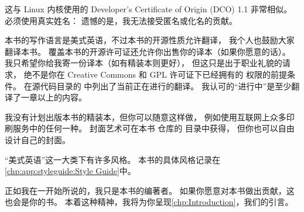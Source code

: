 这与 Linux 内核使用的 Developer's Certificate of Origin (DCO) 1.1
非常相似。
必须使用真实姓名：
遗憾的是，我无法接受匿名或化名的贡献。

本书的写作语言是美式英语，不过本书的开源性质允许翻译，
我个人也鼓励大家翻译本书。
覆盖本书的开源许可证还允许你出售你的译本（如果你愿意的话）。
我只希望你给我寄一份译本（如有精装本则更好），
但这只是出于职业礼貌的请求，
绝不是你在 Creative Commons 和 GPL 许可证下已经拥有的
权限的前提条件。
在源代码目录的  中列出了当前正在进行的翻译。
我认可的``进行中''是至少翻译了一章以上的内容。

我没有计划出版本书的精装本，但你可以随意这样做，
例如使用互联网上众多印刷服务中的任何一种。
封面艺术可在本书  仓库的  目录中获得，
但你也可以自由设计自己的封面。

``美式英语''这一大类下有许多风格。
本书的具体风格记录在\cref{chp:app:styleguide:Style Guide}中。

正如我在一开始所说的，我只是本书的编著者。
如果你愿意对本书做出贡献，这也会是你的书。
本着这种精神，我将为你呈现\cref{chp:Introduction}，我们的引言。


